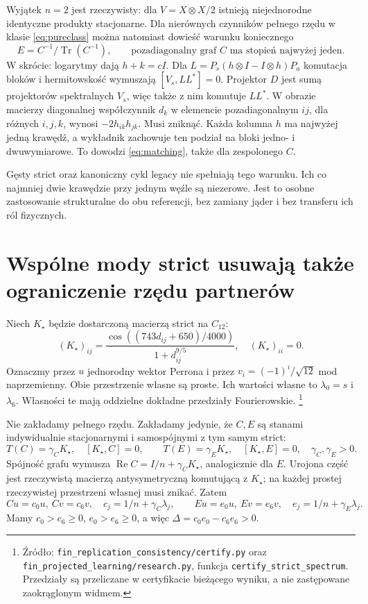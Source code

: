 \documentclass[11pt,a4paper]{article}
\newcommand{\Tr}{\operatorname{Tr}}
\newcommand{\Rea}{\operatorname{Re}}
\begin{document}
Wyjątek $n=2$ jest rzeczywisty: dla $V=X\otimes X/2$ istnieją
niejednorodne identyczne produkty stacjonarne.
Dla nierównych czynników pełnego rzędu w klasie \eqref{eq:pureclass}
można natomiast dowieść warunku koniecznego
\begin{equation}\label{eq:matching}
 E=C^{-1}/\Tr(C^{-1}),\qquad
 \text{pozadiagonalny graf $C$ ma stopień najwyżej jeden}.
\end{equation}
W skrócie: logarytmy dają $h+k=cI$. Dla
$L=P_s(h\otimes I-I\otimes h)P_a$ komutacja bloków i hermitowskość
wymuszają $[V_s,LL^*]=0$. Projektor $D$ jest sumą projektorów
spektralnych $V_s$, więc także z nim komutuje $LL^*$.
W obrazie macierzy diagonalnej współczynnik $d_k$ w elemencie
pozadiagonalnym $ij$, dla różnych $i,j,k$, wynosi $-2h_{ik}h_{jk}$.
Musi zniknąć. Każda kolumna $h$ ma najwyżej jedną krawędź,
a wykładnik zachowuje ten podział na bloki jedno- i dwuwymiarowe.
To dowodzi \eqref{eq:matching}, także dla zespolonego $C$.

Gęsty strict oraz kanoniczny cykl legacy nie spełniają tego warunku.
Ich co najmniej dwie krawędzie przy jednym węźle są niezerowe.
Jest to osobne zastosowanie strukturalne do obu referencji, bez
zamiany jąder i bez transferu ich ról fizycznych.

\section{Wspólne mody strict usuwają także ograniczenie rzędu partnerów}

Niech $K_\star$ będzie dostarczoną macierzą strict na $C_{12}$:
\[
 (K_\star)_{ij}=\frac{\cos((743d_{ij}+650)/4000)}{1+d_{ij}^{9/5}},
 \quad (K_\star)_{ii}=0.
\]
Oznaczmy przez $u$ jednorodny wektor Perrona i przez
$v_i=(-1)^i/\sqrt{12}$ mod naprzemienny. Obie przestrzenie własne
są proste. Ich wartości własne to $\lambda_0=s$ i $\lambda_6$.
Własności te mają oddzielne dokładne przedziały Fourierowskie.
\footnote{Źródło: \texttt{fin\_replication\_consistency/certify.py} oraz
\texttt{fin\_projected\_learning/research.py}, funkcja
\texttt{certify\_strict\_spectrum}. Przedziały są przeliczane w
certyfikacie bieżącego wyniku, a nie zastępowane zaokrąglonym widmem.}

Nie zakładamy pełnego rzędu. Zakładamy jedynie, że $C,E$ są stanami
indywidualnie stacjonarnymi i samospójnymi z tym samym strict:
\begin{equation}\label{eq:states}
 T(C)=\gamma_CK_\star,\quad[K_\star,C]=0,\qquad
 T(E)=\gamma_EK_\star,\quad[K_\star,E]=0,
 \quad\gamma_C,\gamma_E>0.
\end{equation}
Spójność grafu wymusza
$\Rea C=I/n+\gamma_CK_\star$, analogicznie dla $E$.
Urojona część jest rzeczywistą macierzą antysymetryczną komutującą
z $K_\star$; na każdej prostej rzeczywistej przestrzeni własnej musi
znikać. Zatem
\[
 Cu=c_0u,\ Cv=c_6v,\quad c_j=1/n+\gamma_C\lambda_j,
 \qquad Eu=e_0u,\ Ev=e_6v,\quad e_j=1/n+\gamma_E\lambda_j.
\]
Mamy $c_0>c_6\ge0$, $e_0>e_6\ge0$, a więc
$\Delta=c_0e_0-c_6e_6>0$.
\end{document}

